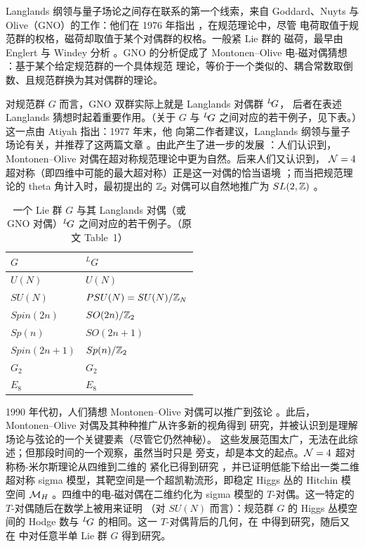  Langlands 纲领与量子场论之间存在联系的第一个线索，来自 Goddard、Nuyts
与 Olive（GNO）的工作：他们在 1976 年指出 \cite{ref10}，在规范理论中，尽管
电荷取值于规范群的权格，磁荷却取值于某个对偶群的权格。一般紧 Lie 群的
磁荷，最早由 Englert 与 Windey 分析 \cite{ref11}。GNO 的分析促成了
Montonen--Olive 电-磁对偶猜想 \cite{ref12}：基于某个给定规范群的一个具体规范
理论，等价于一个类似的、耦合常数取倒数、且规范群换为其对偶群的理论。

 对规范群 $G$ 而言，GNO 双群实际上就是 Langlands 对偶群 $^L\negthinspace G$，
后者在表述 Langlands 猜想时起着重要作用。（关于 $G$ 与 $^L\negthinspace
G$ 之间对应的若干例子，见下表。）这一点由 Atiyah 指出：1977 年末，他
向第二作者建议，Langlands 纲领与量子场论有关，并推荐了这两篇文章
\cite{ref10,ref12}。由此产生了进一步的发展 \cite{ref13}：人们认识到，
Montonen--Olive 对偶在超对称规范理论中更为自然。后来人们又认识到，
${\EUN}=4$ 超对称（即四维中可能的最大超对称）正是这一对偶的恰当语境
\cite{ref14}；而当把规范理论的 theta 角计入时，最初提出的
$\Bbb{Z}_2$ 对偶可以自然地推广为 $SL(2,\Bbb{Z})$ 
\cite{ref15,ref16}。\par\medskip \begin{table}[htbp]
\centering
\begin{tabular}{ll}
\toprule
$G$ & ${}^L G$ \\
\midrule
$U(N)$ & $U(N)$ \\
$SU(N)$ & $PSU(N)=SU(N)/\Bbb{Z}_N$ \\
$Spin(2n)$ & $SO(2n)/\Bbb{Z}_2$ \\
$Sp(n)$ & $SO(2n+1)$ \\
$Spin(2n+1)$ & $Sp(n)/\Bbb{Z}_2$ \\
$G_2$ & $G_2$ \\
$E_8$ & $E_8$ \\
\bottomrule
\end{tabular}
\caption{一个 Lie 群 $G$ 与其 Langlands 对偶（或 GNO 对偶）${}^L\negthinspace G$ 之间对应的若干例子。（原文 Table~1）}
\label{tab:gno-dual}
\end{table}

\cite{ref17}
 1990 年代初，人们猜想 Montonen--Olive 对偶可以推广到弦论
。此后，Montonen--Olive 对偶及其种种推广从许多新的视角得到
研究，并被认识到是理解场论与弦论的一个关键要素（尽管它仍然神秘）。
这些发展范围太广，无法在此综述；但那段时间的一个观察，虽然当时只是
旁支，却是本文的起点。${\EUN}=4$ 超对称杨-米尔斯理论从四维到二维的
紧化已得到研究 \cite{ref18,ref19}，并已证明低能下给出一类二维超对称
sigma 模型，其靶空间是一个超凯勒流形，即稳定 Higgs 丛的 Hitchin 模空间
${\EUM}_H$ \cite{ref20}。四维中的电-磁对偶在二维约化为 sigma 模型的
$T$-对偶。这一特定的 $T$-对偶随后在数学上被用来证明 \cite{ref21}（对
$SU(N)$ 而言）：规范群 $G$ 的 Higgs 丛模空间的 Hodge 数与
${}^L\negthinspace G$ 的相同。这一 $T$-对偶背后的几何，在 \cite{ref22}
中得到研究，随后又在 \cite{ref23} 中对任意半单 Lie 群 $G$ 得到研究。

